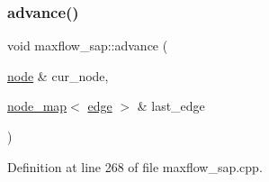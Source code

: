 \subsubsection{\texorpdfstring{advance()}{advance()}}
{\footnotesize\ttfamily void maxflow\+\_\+sap\+::advance (\begin{DoxyParamCaption}\item[{\mbox{\hyperlink{classnode}{node}} \&}]{cur\+\_\+node,  }\item[{\mbox{\hyperlink{classnode__map}{node\+\_\+map}}$<$ \mbox{\hyperlink{classedge}{edge}} $>$ \&}]{last\+\_\+edge }\end{DoxyParamCaption})\hspace{0.3cm}{\ttfamily [protected]}}



Definition at line 268 of file maxflow\+\_\+sap.\+cpp.


